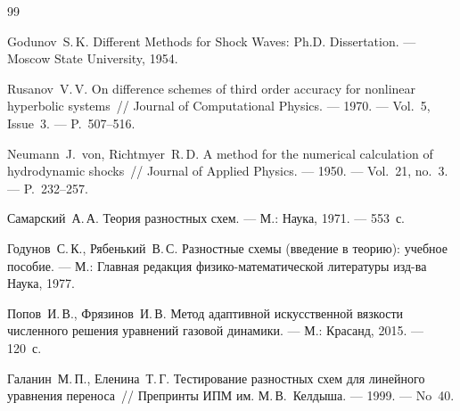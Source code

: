 \documentclass[14pt]{report}
\begin{document}
\begin{thebibliography}{99}
Godunov~S.\,K. Different Methods for Shock Waves: Ph.D. Dissertation. --- Moscow State University, 1954.


Rusanov~V.\,V. On difference schemes of third order accuracy for nonlinear hyperbolic systems~// Journal of Computational Physics. --- 1970. --- Vol.~5, Issue~3. --- P.~507--516.

Neumann~J.~von, Richtmyer~R.\,D. A method for the numerical calculation of hydrodynamic shocks~// Journal of Applied Physics. --- 1950. --- Vol.~21, no.~3. --- P.~232--257.

Самарский~А.\,А. Теория разностных схем. --- М.: Наука, 1971. --- 553~с.

Годунов~С.\,К., Рябенький~В.\,С. Разностные схемы (введение в теорию): учебное пособие. --- М.: Главная редакция физико-математической литературы изд-ва \flqq Наука\frqq, 1977.


Попов~И.\,В., Фрязинов~И.\,В. Метод адаптивной искусственной вязкости численного решения уравнений газовой динамики. --- М.: Красанд, 2015. --- 120~с.

Галанин~М.\,П., Еленина~Т.\,Г. Тестирование разностных схем для линейного уравнения переноса~// Препринты ИПМ им. М.\,В.~Келдыша. --- 1999. --- No~40.
\end{thebibliography}
\end{document}
